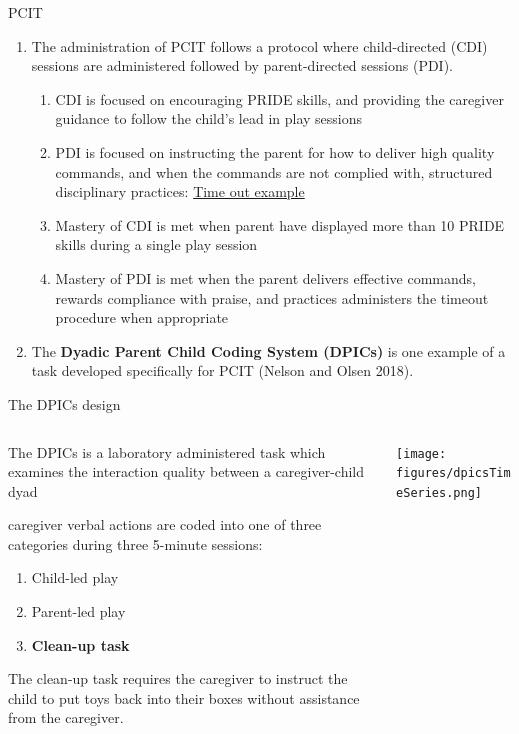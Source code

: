\documentclass[
  ignorenonframetext,
]{beamer}
\providecommand{\tightlist}{%
  \setlength{\itemsep}{0pt}\setlength{\parskip}{0pt}}
\begin{document}
\begin{frame}{PCIT}
\label{pcit}
\begin{enumerate}
\item
  The administration of PCIT follows a protocol where child-directed
  (CDI) sessions are administered followed by parent-directed sessions
  (PDI).

  \begin{enumerate}
  \tightlist
  \item
    CDI is focused on encouraging PRIDE skills, and providing the
    caregiver guidance to follow the child's lead in play sessions
  \item
    PDI is focused on instructing the parent for how to deliver high
    quality commands, and when the commands are not complied with,
    structured disciplinary practices:
    \href{https://youtu.be/CeVhVTAX9v0?t=219}{Time out example}
  \item
    Mastery of CDI is met when parent have displayed more than 10 PRIDE
    skills during a single play session
  \item
    Mastery of PDI is met when the parent delivers effective commands,
    rewards compliance with praise, and practices administers the
    timeout procedure when appropriate
  \end{enumerate}
\item
  The \textbf{Dyadic Parent Child Coding System (DPICs)} is one example
  of a task developed specifically for PCIT (Nelson and Olsen 2018).
\end{enumerate}
\end{frame}

\begin{frame}{The DPICs design}
\label{the-dpics-design}
\begin{columns}[T]
\begin{column}{0.5\textwidth}
The DPICs is a laboratory administered task which examines the
interaction quality between a caregiver-child dyad

caregiver verbal actions are coded into one of three categories during
three 5-minute sessions:

\begin{enumerate}
\item
  Child-led play
\item
  Parent-led play
\item
  \textbf{Clean-up task}
\end{enumerate}

The clean-up task requires the caregiver to instruct the child to put
toys back into their boxes without assistance from the caregiver.
\end{column}

\begin{column}{0.5\textwidth}
\texttt{[image: figures/dpicsTimeSeries.png]}
\end{column}
\end{columns}
\end{frame}
\end{document}
